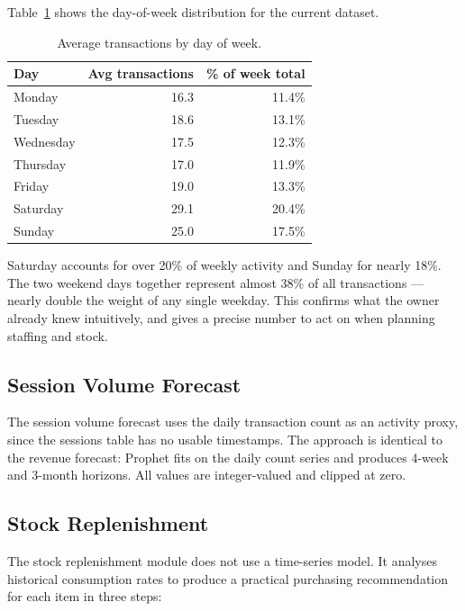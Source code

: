Table~\ref{tab:peak_hours_day} shows the day-of-week distribution for the current
dataset.

\begin{table}[H]
  \centering
  \caption{Average transactions by day of week.\label{tab:peak_hours_day}}
  \begin{tabular}{lrr}
    \toprule
    \textbf{Day} & \textbf{Avg transactions} & \textbf{\% of week total} \\
    \midrule
    Monday    & 16.3 & 11.4\% \\
    Tuesday   & 18.6 & 13.1\% \\
    Wednesday & 17.5 & 12.3\% \\
    Thursday  & 17.0 & 11.9\% \\
    Friday    & 19.0 & 13.3\% \\
    Saturday  & 29.1 & 20.4\% \\
    Sunday    & 25.0 & 17.5\% \\
    \bottomrule
  \end{tabular}
\end{table}

Saturday accounts for over 20\% of weekly activity and Sunday for nearly 18\%. The two
weekend days together represent almost 38\% of all transactions --- nearly double the
weight of any single weekday. This confirms what the owner already knew intuitively,
and gives a precise number to act on when planning staffing and stock.

\subsection{Session Volume Forecast}

The session volume forecast uses the daily transaction count as an activity proxy,
since the sessions table has no usable timestamps. The approach is identical to the
revenue forecast: Prophet fits on the daily count series and produces 4-week and
3-month horizons. All values are integer-valued and clipped at zero.

\subsection{Stock Replenishment}

The stock replenishment module does not use a time-series model. It analyses
historical consumption rates to produce a practical purchasing recommendation for
each item in three steps:

